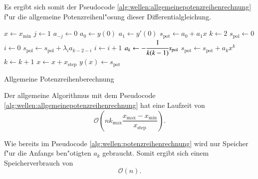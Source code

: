 Es ergibt sich somit der 
Pseudocode \ref{alg:wellen:allgemeinepotenzreihenrechnung} f"ur die 
allgemeine Potenzreihenl"osung dieser Differentialgleichung.

\begin{algorithm}
	\begin{algorithmic}[1]
		\State $x \gets x_{\text{min}}$
			\State $j \gets 1$
				\State $a_{-j} \gets 0$
			\EndFor
			\State $a_0 \gets y(0)$
			\State $a_1 \gets y'(0)$
			\State $s_{\text{pot}} \gets a_0 + a_1x$
			\State $k \gets 2$
				\State $s_{\text{pol}} \gets 0$
				\State $i \gets 0$
					\State $s_{\text{pol}} \gets s_{\text{pol}}+\lambda_i 
					a_{k-2-i}$
					\State $i \gets i + 1$
				\EndFor
				\State $a_k \gets -\cfrac{1}{k(k-1)} s_{\text{pol}}$
				\State $s_{\text{pot}} \gets s_{\text{pot}} + a_k x^k$
				\State $k \gets k + 1$
			\EndFor
			\State $x \gets x + x_{\text{step}}$
			\State $y(x) \gets s_{\text{pot}}$
		\EndFor
	\end{algorithmic}
	
	\caption{Allgemeine Potenzreihenberechnung} 
	\label{alg:wellen:allgemeinepotenzreihenrechnung}
\end{algorithm}

Der allgemeine Algorithmus mit dem Pseudocode 
\ref{alg:wellen:allgemeinepotenzreihenrechnung} hat eine Laufzeit von
\begin{equation*}
	\mathcal{O}
	\left(
		nk_{\text{max}}\frac{x_{\text{max}}-x_{\text{min}}}{x_{\text{step}}}
	\right).
\end{equation*}

Wie bereits im Pseudocode \ref{alg:wellen:potenzreihenrechnung} wird nur 
Speicher f"ur die Anfangs ben"otigten $a_k$ gebraucht. Somit ergibt sich einem 
Speicherverbrauch von
\begin{equation*}
	\mathcal{O}
	\left(
		n
	\right).
\end{equation*}